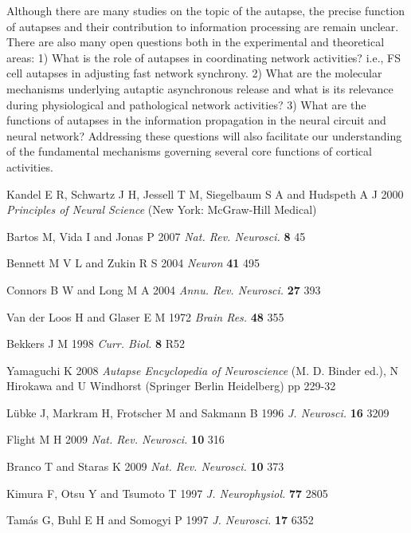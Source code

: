 \documentclass[twocolumn,showpacs,preprintnumbers,amsmath,amssymb,pre,superscriptaddress]{revtex4-1}
\begin{document}
\begin{CJK}{UTF8}{gbsn}
Although there are many studies on the topic of the autapse, the precise function of autapses and their contribution to information processing are remain unclear. There are also many open questions both in the experimental and theoretical areas: 1) What is the role of autapses in coordinating network activities? i.e., FS cell autapses in adjusting fast network synchrony. 2) What are the molecular mechanisms underlying autaptic asynchronous release and what is its relevance during physiological and pathological network activities? 3) What are the functions of autapses in the information propagation in the neural circuit and neural network? Addressing these questions will also facilitate our understanding of the fundamental mechanisms governing several core functions of cortical activities.

\begin{thebibliography}{999}
 Kandel E R, Schwartz J H, Jessell T M, Siegelbaum S A and Hudspeth A J 2000 \textit{Principles of Neural Science} (New York: McGraw-Hill Medical)

 Bartos M, Vida I and Jonas P 2007 \textit{Nat. Rev. Neurosci.} \textbf{8} 45

 Bennett M V L and Zukin R S 2004 \textit{Neuron} \textbf{41} 495

 Connors B W and Long M A 2004 \textit{Annu. Rev. Neurosci.} \textbf{27} 393

Van der Loos H and Glaser E M 1972 \textit{Brain Res.} \textbf{48} 355

 Bekkers J M 1998 \textit{Curr. Biol.} \textbf{8} R52

 Yamaguchi K 2008 \textit{Autapse Encyclopedia of Neuroscience} (M. D. Binder ed.), N Hirokawa and U Windhorst (Springer Berlin Heidelberg) pp 229-32

 L\"{u}bke J, Markram H, Frotscher M and Sakmann B 1996 \textit{J. Neurosci. } \textbf{16} 3209

 Flight M H 2009 \textit{Nat. Rev. Neurosci. } \textbf{10} 316 

 Branco T and Staras K 2009 \textit{Nat. Rev. Neurosci.} \textbf{10}  373 

 Kimura F, Otsu Y and Tsumoto T 1997 \textit{J. Neurophysiol.} \textbf{77} 2805 

 Tam\'{a}s G, Buhl E H and Somogyi P 1997  \textit{J. Neurosci.} \textbf{17} 6352


\end{thebibliography}
\end{CJK}
\end{document}
